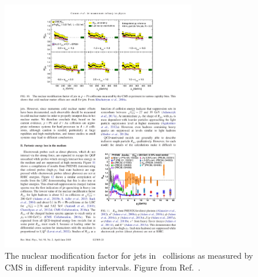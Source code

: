 \begin{figure}[htbp]
\begin{center}
\includegraphics[width=0.75\textwidth]{figures/theory/RpPb}
\caption{The nuclear modification factor for jets in \pPb\ collisions as measured by CMS in different rapidity intervals.
Figure from Ref.~\cite{Khachatryan2016b}.}
\label{fig:RpPb}
\end{center}
\end{figure}

